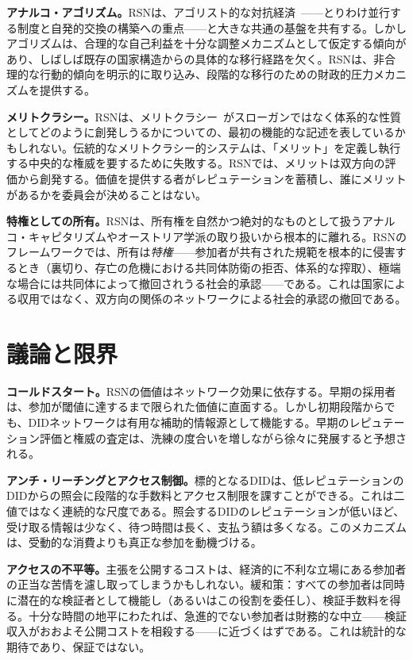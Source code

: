 \documentclass[11pt,a4paper,twocolumn]{article}
\begin{document}
\textbf{アナルコ・アゴリズム。}RSNは、アゴリスト的な対抗経済~\cite{konkin2006}——とりわけ並行する制度と自発的交換の構築への重点——と大きな共通の基盤を共有する。しかしアゴリズムは、合理的な自己利益を十分な調整メカニズムとして仮定する傾向があり、しばしば既存の国家構造からの具体的な移行経路を欠く。RSNは、非合理的な行動的傾向を明示的に取り込み、段階的な移行のための財政的圧力メカニズムを提供する。

\textbf{メリトクラシー。}RSNは、メリトクラシー~\cite{young1958}がスローガンではなく体系的な性質としてどのように創発しうるかについての、最初の機能的な記述を表しているかもしれない。伝統的なメリトクラシー的システムは、「メリット」を定義し執行する中央的な権威を要するために失敗する。RSNでは、メリットは双方向の評価から創発する。価値を提供する者がレピュテーションを蓄積し、誰にメリットがあるかを委員会が決めることはない。

\textbf{特権としての所有。}RSNは、所有権を自然かつ絶対的なものとして扱うアナルコ・キャピタリズムやオーストリア学派の取り扱いから根本的に離れる。RSNのフレームワークでは、所有は\emph{特権}——参加者が共有された規範を根本的に侵害するとき（裏切り、存亡の危機における共同体防衛の拒否、体系的な搾取）、極端な場合には共同体によって撤回されうる社会的承認——である。これは国家による収用ではなく、双方向の関係のネットワークによる社会的承認の撤回である。

\section{議論と限界}

\textbf{コールドスタート。}RSNの価値はネットワーク効果に依存する。早期の採用者は、参加が閾値に達するまで限られた価値に直面する。しかし初期段階からでも、DIDネットワークは有用な補助的情報源として機能する。早期のレピュテーション評価と権威の査定は、洗練の度合いを増しながら徐々に発展すると予想される。

\textbf{アンチ・リーチングとアクセス制御。}標的となるDIDは、低レピュテーションのDIDからの照会に段階的な手数料とアクセス制限を課すことができる。これは二値ではなく連続的な尺度である。照会するDIDのレピュテーションが低いほど、受け取る情報は少なく、待つ時間は長く、支払う額は多くなる。このメカニズムは、受動的な消費よりも真正な参加を動機づける。

\textbf{アクセスの不平等。}主張を公開するコストは、経済的に不利な立場にある参加者の正当な苦情を濾し取ってしまうかもしれない。緩和策：すべての参加者は同時に潜在的な検証者として機能し（あるいはこの役割を委任し）、検証手数料を得る。十分な時間の地平にわたれば、急進的でない参加者は財務的な中立——検証収入がおおよそ公開コストを相殺する——に近づくはずである。これは統計的な期待であり、保証ではない。
\end{document}
